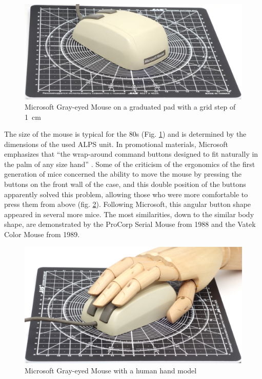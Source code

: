 \documentclass[11pt, a4paper]{article}
\begin{document}
\begin{figure}[h]
    \centering
    \includegraphics[scale=0.5]{1985_microsoft_gray_eyed_mouse/size_30.jpg}
    \caption{Microsoft Gray-eyed Mouse on a graduated pad with a grid step of 1~cm}
    \label{fig:MicrosoftGrayEyedSize}
\end{figure}

The size of the mouse is typical for the 80s (Fig. \ref{fig:MicrosoftGrayEyedSize}) and is determined by the dimensions of the used ALPS unit. In promotional materials, Microsoft emphasizes that ``the wrap-around command buttons designed to fit naturally in the palm of any size hand'' \cite{mouses}. Some of the criticism of the ergonomics of the first generation of mice concerned the ability to move the mouse by pressing the buttons on the front wall of the case, and this double position of the buttons apparently solved this problem, allowing those who were more comfortable to press them from above (fig. \ref{fig:MicrosoftGrayEyedHand}). Following Microsoft, this angular button shape appeared in several more mice. The most similarities, down to the similar body shape, are demonstrated by the ProCorp Serial Mouse from 1988 and the Vatek Color Mouse from 1989.

\begin{figure}[h]
    \centering
    \includegraphics[scale=0.5]{1985_microsoft_gray_eyed_mouse/hand_30.jpg}
    \caption{Microsoft Gray-eyed Mouse with a human hand model}
    \label{fig:MicrosoftGrayEyedHand}
\end{figure}
\end{document}

